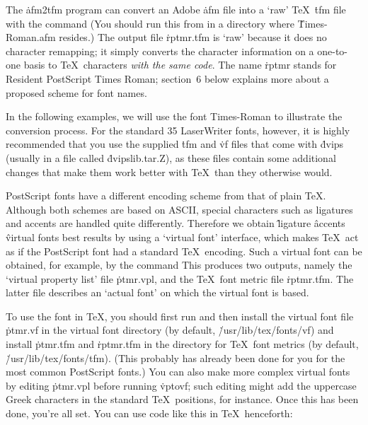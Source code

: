 
The \.{afm2tfm} program can convert an Adobe \.{afm} file into a `raw'
\TeX\ \.{tfm} file with the command
\noindent
(You should run this from in a directory where \.{Times-Roman.afm} resides.)
The output file \.{rptmr.tfm} is `raw' because it does no character remapping;
it simply converts the character information on a one-to-one basis to \TeX\
characters {\it with the same code}. The name \.{rptmr} stands for
Resident PostScript Times Roman; section~6 below explains more about
a proposed scheme for font names.

In the following examples, we will use the font Times-Roman to
illustrate the conversion process.  For the standard 35 LaserWriter
fonts, however, it is highly recommended that you use the supplied
\.{tfm} and \.{vf} files that come with \.{dvips} (usually in a
file called \.{dvipslib.tar.Z}), as these files contain some additional
changes that make them work better with \TeX\ than they otherwise
would.

PostScript fonts have a different encoding scheme from that of plain
\TeX. Although both schemes are based on ASCII, special characters such as
ligatures and accents are handled quite differently. Therefore we obtain
\^{ligature}
\^{accents}
\^{virtual fonts}
best results by using a `virtual font' interface, which makes \TeX\ act
as if the PostScript font had a standard \TeX\ encoding. Such a virtual
font can be obtained, for example, by the command
\noindent
This produces two outputs, namely the `virtual property list' file
\.{ptmr.vpl}, and the \TeX\ font metric file \.{rptmr.tfm}.
The latter file describes an `actual font' on which the virtual font is based.

To use the font in \TeX, you should first run
\noindent
and then install the virtual font file \.{ptmr.vf} in the virtual font
directory (by default, \.{/usr/lib/tex/fonts/vf}) and install \.{ptmr.tfm}
and \.{rptmr.tfm} in the directory for \TeX\ font metrics (by default,
\.{/usr/lib/tex/fonts/tfm}).  (This probably has already been done for you for
the most common PostScript fonts.)
You can also make more complex virtual fonts by editing
\.{ptmr.vpl} before running \.{vptovf}; such editing might add the uppercase
Greek characters in the standard \TeX\ positions, for instance.
Once this has been done, you're all set. You can use
code like this in \TeX\ henceforth:

